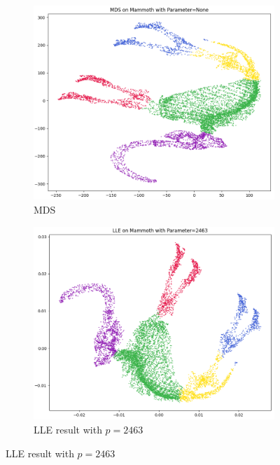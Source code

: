 \begin{figure}[!]
     \centering
     \begin{subfigure}[t]{0.51\columnwidth}
    	\centering
    	\includegraphics[width=\columnwidth]{images/mammoth_mds_plot.png}
    	\caption{MDS}
        \label{fig:mammoth_mds_plot}
    \end{subfigure}
     \hfill
     \begin{subfigure}[t]{0.49\columnwidth}
    	\centering
    	\includegraphics[width=\columnwidth]{images/mammoth_lle2463_plot.png}
    	\caption{LLE result with $p=2463$}
        \label{fig:mammoth_lle2463_plot}

\end{subfigure}
\end{figure}
